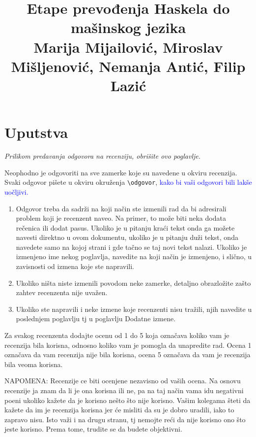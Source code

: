 \documentclass[a4paper]{report}
\newcommand{\odgovor}[1]{\textcolor{blue}{#1}}
\begin{document}
	
	\title{Etape prevođenja Haskela do mašinskog jezika\\ \small{Marija Mijailović, Miroslav Mišljenović, Nemanja Antić, Filip Lazić}}
	
	\maketitle
	
	\tableofcontents
	
	\chapter{Uputstva}
	\emph{Prilikom predavanja odgovora na recenziju, obrišite ovo poglavlje.}
	
	Neophodno je odgovoriti na sve zamerke koje su navedene u okviru recenzija. Svaki odgovor pišete u okviru okruženja \verb"\odgovor", \odgovor{kako bi vaši odgovori bili lakše uočljivi.} 
	\begin{enumerate}
		
		\item Odgovor treba da sadrži na koji način ste izmenili rad da bi adresirali problem koji je recenzent naveo. Na primer, to može biti neka dodata rečenica ili dodat pasus. Ukoliko je u pitanju kraći tekst onda ga možete navesti direktno u ovom dokumentu, ukoliko je u pitanju duži tekst, onda navedete samo na kojoj strani i gde tačno se taj novi tekst nalazi. Ukoliko je izmenjeno ime nekog poglavlja, navedite na koji način je izmenjeno, i slično, u zavisnosti od izmena koje ste napravili. 
		
		\item Ukoliko ništa niste izmenili povodom neke zamerke, detaljno obrazložite zašto zahtev recenzenta nije uvažen.
		
		\item Ukoliko ste napravili i neke izmene koje recenzenti nisu tražili, njih navedite u poslednjem poglavlju tj u poglavlju Dodatne izmene.
	\end{enumerate}
	
	Za svakog recenzenta dodajte ocenu od 1 do 5 koja označava koliko vam je recenzija bila korisna, odnosno koliko vam je pomogla da unapredite rad. Ocena 1 označava da vam recenzija nije bila korisna, ocena 5 označava da vam je recenzija bila veoma korisna. 
	
	NAPOMENA: Recenzije ce biti ocenjene nezavisno od vaših ocena. Na osnovu recenzije ja znam da li je ona korisna ili ne, pa na taj način vama idu negativni poeni ukoliko kažete da je korisno nešto što nije korisno. Vašim kolegama šteti da kažete da im je recenzija korisna jer će misliti da su je dobro uradili, iako to zapravo nisu. Isto važi i na drugu stranu, tj nemojte reći da nije korisno ono što jeste korisno. Prema tome, trudite se da budete objektivni. 
\end{document}
